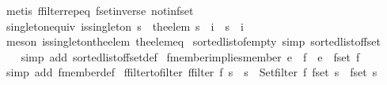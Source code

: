 \begin{isabellebody}
\ {\isacharparenleft}metis\ ffilter{\isachardot}rep{\isacharunderscore}eq\ fset{\isacharunderscore}inverse\ notin{\isacharunderscore}fset{\isacharparenright}%
\endisatagproof
{\isafoldproof}%
%
\isadelimproof
\isanewline
%
\endisadelimproof
\isanewline
{}\isamarkupfalse%
\ singleton{\isacharunderscore}equiv{\isacharcolon}\ {\isachardoublequoteopen}is{\isacharunderscore}singleton\ s\ {\isasymLongrightarrow}\ {\isacharparenleft}the{\isacharunderscore}elem\ s\ {\isacharequal}\ i{\isacharparenright}\ {\isacharequal}\ {\isacharparenleft}s\ {\isacharequal}\ {\isacharbraceleft}i{\isacharbraceright}{\isacharparenright}{\isachardoublequoteclose}\isanewline
%
\isadelimproof
\ \ %
\endisadelimproof
%
\isatagproof
{}\isamarkupfalse%
\ {\isacharparenleft}meson\ is{\isacharunderscore}singleton{\isacharunderscore}the{\isacharunderscore}elem\ the{\isacharunderscore}elem{\isacharunderscore}eq{\isacharparenright}%
\endisatagproof
{\isafoldproof}%
%
\isadelimproof
\isanewline
%
\endisadelimproof
\isanewline
{}\isamarkupfalse%
\ sorted{\isacharunderscore}list{\isacharunderscore}of{\isacharunderscore}empty\ {\isacharbrackleft}simp{\isacharbrackright}{\isacharcolon}\ {\isachardoublequoteopen}sorted{\isacharunderscore}list{\isacharunderscore}of{\isacharunderscore}fset\ {\isacharbraceleft}{\isacharbar}{\isacharbar}{\isacharbraceright}\ {\isacharequal}\ {\isacharbrackleft}{\isacharbrackright}{\isachardoublequoteclose}\isanewline
%
\isadelimproof
\ \ %
\endisadelimproof
%
\isatagproof
{}\isamarkupfalse%
\ {\isacharparenleft}simp\ add{\isacharcolon}\ sorted{\isacharunderscore}list{\isacharunderscore}of{\isacharunderscore}fset{\isacharunderscore}def{\isacharparenright}%
\endisatagproof
{\isafoldproof}%
%
\isadelimproof
\isanewline
%
\endisadelimproof
\isanewline
{}\isamarkupfalse%
\ fmember{\isacharunderscore}implies{\isacharunderscore}member{\isacharcolon}\ {\isachardoublequoteopen}e\ {\isacharbar}{\isasymin}{\isacharbar}\ f\ {\isasymLongrightarrow}\ e\ {\isasymin}\ fset\ f{\isachardoublequoteclose}\isanewline
%
\isadelimproof
\ \ %
\endisadelimproof
%
\isatagproof
{}\isamarkupfalse%
\ {\isacharparenleft}simp\ add{\isacharcolon}\ fmember{\isacharunderscore}def{\isacharparenright}%
\endisatagproof
{\isafoldproof}%
%
\isadelimproof
\isanewline
%
\endisadelimproof
\isanewline
{}\isamarkupfalse%
\ ffilter{\isacharunderscore}to{\isacharunderscore}filter{\isacharcolon}\ {\isachardoublequoteopen}{\isacharparenleft}ffilter\ f\ s\ {\isacharequal}\ s{\isacharprime}{\isacharparenright}\ {\isacharequal}\ {\isacharparenleft}Set{\isachardot}filter\ f\ {\isacharparenleft}fset\ s{\isacharparenright}\ {\isacharequal}\ fset\ s{\isacharprime}{\isacharparenright}{\isachardoublequoteclose}\isanewline

\end{isabellebody}
